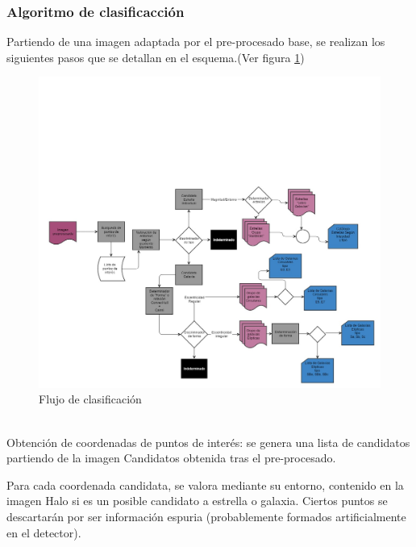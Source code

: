 	\subsubsection{Algoritmo de clasificacción}
	Partiendo de una imagen adaptada por el pre-procesado base, se realizan los siguientes pasos que se detallan en el esquema.(Ver figura \ref{fig:esquemaClasificaciosn})\\
	\begin{figure}[!htb]
		\centering
		\includegraphics[width=1\textwidth]{images/tfg2016algoritmos_de_catalogaci_n.jpg}
		\caption{\label{fig:esquemaClasificaciosn}Flujo de clasificación}
	\end{figure}
	\\Obtención de coordenadas de puntos de interés: se genera una lista de candidatos partiendo de la imagen Candidatos obtenida tras el pre-procesado.
	
	Para cada coordenada candidata, se valora mediante su entorno, contenido en la imagen Halo si es un posible candidato a estrella o galaxia. Ciertos puntos se descartarán por ser información espuria (probablemente formados artificialmente en el detector).
	
	
